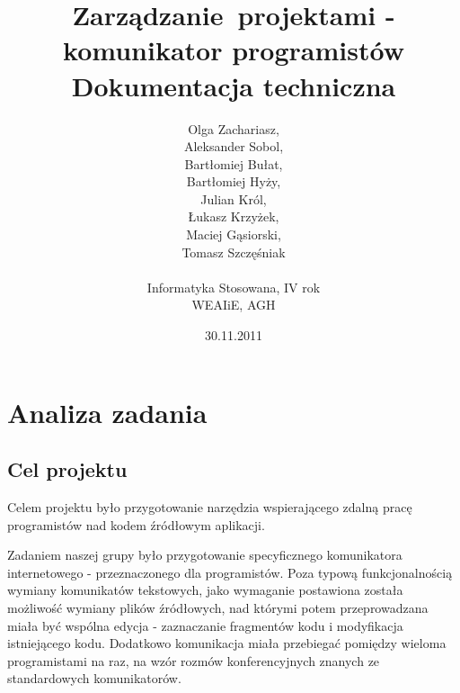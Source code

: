 \documentclass[polish,11pt,a4paper,twoside]{article}
\begin{document}
\pagestyle{fancy}
\fancyhf{} %
\fancyfoot[R]{\footnotesize \thepage}
\renewcommand{\headrulewidth}{0pt}
\renewcommand{\footrulewidth}{0pt}

\author{Olga Zachariasz,\\Aleksander Sobol,\\Bartłomiej Bułat,\\Bartłomiej Hyży,\\Julian Król,\\Łukasz Krzyżek,\\Maciej Gąsiorski,\\Tomasz Szczęśniak\\\\Informatyka Stosowana, IV rok\\WEAIiE, AGH}
\date{30.11.2011}
\title{Zarządzanie~projektami - komunikator programistów\\Dokumentacja techniczna}
\maketitle

\begin{spacing}{0.8}
\tableofcontents
\end{spacing}

\pagebreak

\thispagestyle{fancy}

\section{Analiza zadania}

\subsection{Cel projektu}

Celem projektu było przygotowanie narzędzia wspierającego zdalną pracę programistów nad kodem źródłowym aplikacji.

Zadaniem naszej grupy było przygotowanie specyficznego komunikatora internetowego - przeznaczonego dla programistów. Poza typową funkcjonalnością wymiany komunikatów tekstowych, jako wymaganie postawiona została możliwość wymiany plików źródłowych, nad którymi potem przeprowadzana miała być wspólna edycja - zaznaczanie fragmentów kodu i modyfikacja istniejącego kodu. Dodatkowo komunikacja miała przebiegać pomiędzy wieloma programistami na raz, na wzór rozmów konferencyjnych znanych ze standardowych komunikatorów.
\end{document}
